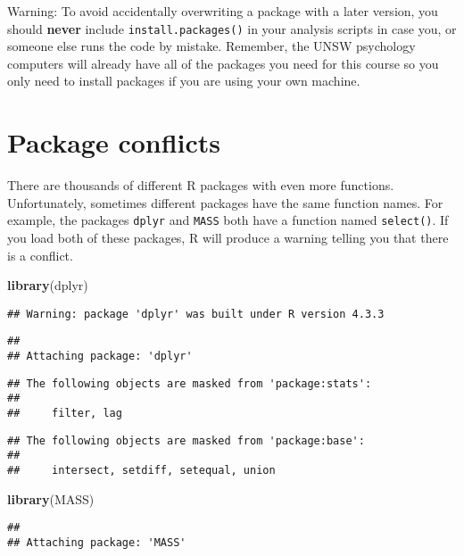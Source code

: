 \documentclass[
]{book}
\newenvironment{Shaded}{\begin{snugshade}}{\end{snugshade}}
\newcommand{\FunctionTok}[1]{\textcolor[rgb]{0.13,0.29,0.53}{\textbf{#1}}}
\newcommand{\NormalTok}[1]{#1}
\begin{document}
Warning: To avoid accidentally overwriting a package with a later version, you should \textbf{never} include \texttt{install.packages()} in your analysis scripts in case you, or someone else runs the code by mistake. Remember, the UNSW psychology computers will already have all of the packages you need for this course so you only need to install packages if you are using your own machine.

\section{Package conflicts}\label{package-conflicts}

There are thousands of different R packages with even more functions. Unfortunately, sometimes different packages have the same function names. For example, the packages \texttt{dplyr} and \texttt{MASS} both have a function named \texttt{select()}. If you load both of these packages, R will produce a warning telling you that there is a conflict.

\begin{Shaded}
\begin{Highlighting}[]
\FunctionTok{library}\NormalTok{(dplyr)}
\end{Highlighting}
\end{Shaded}

\begin{verbatim}
## Warning: package 'dplyr' was built under R version 4.3.3
\end{verbatim}

\begin{verbatim}
## 
## Attaching package: 'dplyr'
\end{verbatim}

\begin{verbatim}
## The following objects are masked from 'package:stats':
## 
##     filter, lag
\end{verbatim}

\begin{verbatim}
## The following objects are masked from 'package:base':
## 
##     intersect, setdiff, setequal, union
\end{verbatim}

\begin{Shaded}
\begin{Highlighting}[]
\FunctionTok{library}\NormalTok{(MASS)}
\end{Highlighting}
\end{Shaded}

\begin{verbatim}
## 
## Attaching package: 'MASS'
\end{verbatim}
\end{document}
